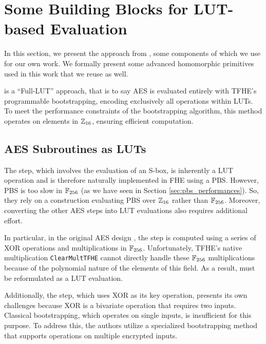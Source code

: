 
\section{Some Building Blocks for LUT-based Evaluation}
\label{sec:previous-blocks}


In this section, we present the approach from \cite{DBLP:conf/wahc/TramaCBS23}, some components of which we use for our own work. We formally present some advanced homomorphic primitives used in this work that we reuse as well.


\cite{DBLP:conf/wahc/TramaCBS23} is a ``Full-\acrshort{LUT}'' approach, that is to say \gls{AES} is evaluated entirely with \gls{TFHE}'s programmable bootstrapping, encoding exclusively all operations within LUTs. To meet the performance constraints of the bootstrapping algorithm, this method operates on elements in $\mathbb{Z}_{16}$, ensuring efficient computation.

\subsection{AES Subroutines as LUTs}

The \SubBytes step, which involves the evaluation of an \gls{S-box}, is inherently a \gls{LUT} operation and is therefore naturally implemented in \gls{FHE} using a \gls{PBS}. However, \gls{PBS} is too slow in $\mathbb{F}_{256}$ (as we have seen in Section \ref{sec:pbs_performances}). So, they rely on a construction evaluating \gls{PBS} over $\mathbb{Z}_{16}$ rather than $\mathbb{F}_{256}$. Moreover, converting the other \gls{AES} steps into \gls{LUT} evaluations also requires additional effort.

In particular, in the original \gls{AES} design \cite{aes-original}, the \MixColumns step is computed using a series of XOR operations and multiplications in $\mathbb{F}_{256}$. Unfortunately, \gls{TFHE}’s native multiplication \texttt{ClearMultTFHE} cannot directly handle these $\mathbb{F}_{256}$ multiplications because of the polynomial nature of the elements of this field. As a result, \MixColumns must be reformulated as a \gls{LUT} evaluation.

Additionally, the \AddRoundKey step, which uses XOR as its key operation, presents its own challenges because XOR is a bivariate operation that requires two inputs. Classical bootstrapping, which operates on single inputs, is insufficient for this purpose. To address this, the authors utilize a specialized bootstrapping method that supports operations on multiple encrypted inputs.

